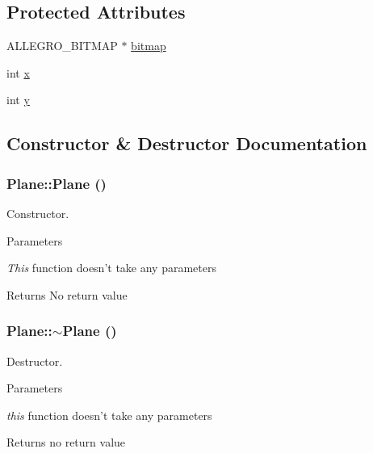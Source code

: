 \subsection*{Protected Attributes}
\begin{DoxyCompactItemize}
\item 
ALLEGRO\_\-BITMAP $\ast$ \hyperlink{classPlane_a5f3754de26e2b832d79fd83752b0f2df}{bitmap}
\item 
int \hyperlink{classPlane_a31fa7567ef20b26ca2cafad6f17a776b}{x}
\item 
int \hyperlink{classPlane_ace518f4f4d6d29db13e41276a327c323}{y}
\end{DoxyCompactItemize}


\subsection{Constructor \& Destructor Documentation}
\hypertarget{classPlane_acac0d9c003e0ab10d07b146c3566a0c7}{
\subsubsection[{Plane}]{\setlength{\rightskip}{0pt plus 5cm}Plane::Plane ()}}
\label{classPlane_acac0d9c003e0ab10d07b146c3566a0c7}


Constructor. 
\begin{DoxyParams}{Parameters}
\item[{\em This}]function doesn't take any parameters \end{DoxyParams}
\begin{DoxyReturn}{Returns}
No return value 
\end{DoxyReturn}
\hypertarget{classPlane_a69abd86051c880dcb44b249ad10c4436}{
\subsubsection[{$\sim$Plane}]{\setlength{\rightskip}{0pt plus 5cm}Plane::$\sim$Plane ()}}
\label{classPlane_a69abd86051c880dcb44b249ad10c4436}


Destructor. 
\begin{DoxyParams}{Parameters}
\item[{\em this}]function doesn't take any parameters \end{DoxyParams}
\begin{DoxyReturn}{Returns}
no return value 
\end{DoxyReturn}


